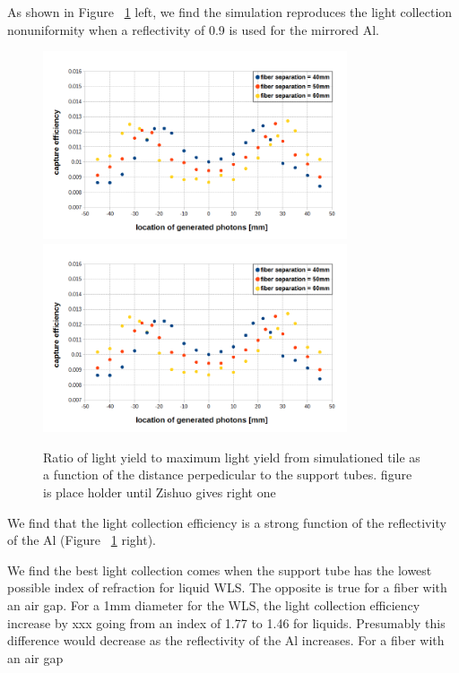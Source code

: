 \documentclass[review]{elsarticle}
\begin{document}
As shown in Figure ~\ref{fig:simeff} left, we find the simulation reproduces the light collection nonuniformity when a reflectivity of 0.9 is used for the mirrored Al.

\begin{figure}[!ht]
\begin{center}
\includegraphics[width=0.8\textwidth]{./figures/geant_result_uniformity.png}
\includegraphics[width=0.8\textwidth]{./figures/geant_result_uniformity.png}
\caption{
Ratio of light yield to maximum light yield from simulationed tile as a function of the distance perpedicular to the support tubes. {\color{red} figure is place holder until Zishuo gives right one}
}
\label{fig:simeff}
\end{center}
\end{figure}


We find that the light collection efficiency is a strong function of the reflectivity of the Al (Figure ~\ref{fig:simeff} right).


We find the best light collection comes when the support tube has the
lowest possible index of refraction for liquid WLS.  The opposite is true for a fiber with an air gap.  For a 1mm diameter for the WLS,
the light collection efficiency increase by xxx going from an index of
1.77 to 1.46 for liquids.  Presumably this difference would decrease as the reflectivity of the Al increases. For a fiber with an air gap
\end{document}
